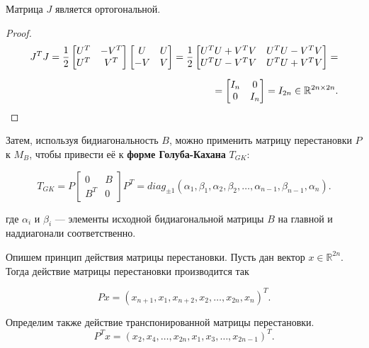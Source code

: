 \begin{claim}
    Матрица \(J\) является ортогональной.
\end{claim}
\begin{proof}
    \begin{equation*}
        \begin{split}
            J^T J= \frac{1}{2} \begin{bmatrix} U^T &-V^T\\ U^T & V^T \end{bmatrix} \begin{bmatrix} U & U \\ -V & V \end{bmatrix} = \frac{1}{2} \begin{bmatrix}
        U^TU+V^TV & U^TU-V^TV \\ U^TU-V^TV & U^TU+V^TV
    \end{bmatrix} =\\[6pt] = \begin{bmatrix}
        I_n & 0 \\ 0 & I_n
    \end{bmatrix} = I_{2n} \in \mathbb{R}^{2n \times 2n}.
        \end{split}
    \end{equation*}
\end{proof}

Затем, используя бидиагональность \( B \), можно применить матрицу перестановки \( P \) к \( M_B \), чтобы привести её к \textbf{форме Голуба-Кахана} \( T_{GK} \):

\begin{equation}
T_{GK} = P \begin{bmatrix} 0 & B \\ B^T & 0 \end{bmatrix} P^T = diag_{\pm 1}(\alpha_1,\beta_1,\alpha_2,\beta_2,\dots,\alpha_{n-1},\beta_{n-1},\alpha_{n}).
\end{equation}

где \( \alpha_i \) и \( \beta_i \) — элементы исходной бидиагональной матрицы \( B \) на главной и наддиагонали соответственно. 

Опишем принцип действия матрицы перестановки. Пусть дан вектор \(x \in \mathbb{R}^{2n} \). Тогда действие матрицы перестановки производится так

\begin{equation}
    Px=(x_{n+1},x_1, x_{n+2},x_2,\dots,x_{2n},x_n)^T.
\end{equation}
\begin{note}
    Определим также действие транспонированной матрицы перестановки.
    \begin{equation}
        P^Tx=(x_2,x_4,\dots,x_{2n},x_1,x_3,\dots,x_{2n-1})^T.
    \end{equation}
\end{note}

